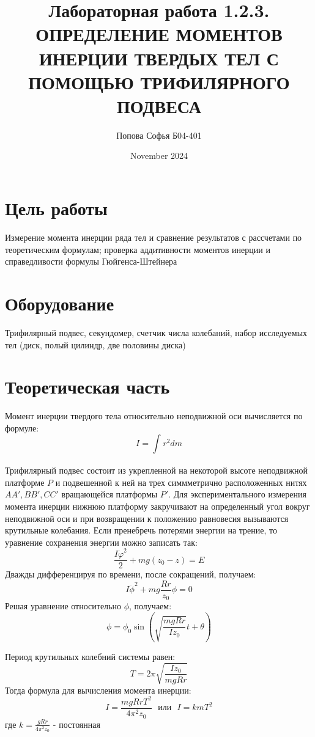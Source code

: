 \documentclass{article}
\title{\textbf{Лабораторная работа 1.2.3.} \linebreak
ОПРЕДЕЛЕНИЕ МОМЕНТОВ ИНЕРЦИИ ТВЕРДЫХ ТЕЛ С ПОМОЩЬЮ ТРИФИЛЯРНОГО ПОДВЕСА}
\author{Попова Софья Б04-401}
\date{November 2024}
\begin{document}
\maketitle

\section*{Цель работы}
Измерение момента инерции ряда тел и сравнение результатов с рассчетами по теоретическим формулам; проверка аддитивности моментов инерции и справедливости формулы Гюйгенса-Штейнера

\section*{Оборудование}
Трифилярный подвес, секундомер, счетчик числа колебаний, набор исследуемых тел (диск, полый цилиндр, две половины диска) 

\section*{Теоретическая часть}
Момент инерции твердого тела относительно неподвижной оси вычисляется по формуле: 
\begin{equation}
    I=\int_{}^{}r^2dm
\end{equation}

\noindent
Трифилярный подвес состоит из укрепленной на некоторой высоте неподвижной платформе $P$ и подвешенной к ней на трех симмметрично расположенных нитях $AA', BB', CC'$ вращающейся платформы $P'$. Для экспериментального измерения момента инерции нижнюю платформу закручивают на определенный угол вокруг неподвижной оси и при возвращении к положению равновесия вызываются крутильные колебания. Если пренебречь потерями энергии на трение, то уравнение сохранения энергии можно записать так: 
\begin{equation}
    \frac{I\dot{\varphi}^2}{2} + mg(z_0 - z) = E
\end{equation}
Дважды дифференцируя по времени, после сокращений, получаем:	
\begin{equation}
	I\ddot{\phi}^2 + mg\frac{Rr}{z_{0}}\phi = 0 
\end{equation}
Решая уравнение относительно $\phi$, получаем:
\begin{equation}
	\phi = \phi_{0}\sin\left(\sqrt{\frac{mgRr}{Iz_{0}}}t + \theta\right)
\end{equation}

\noindent
Период крутильных колебний системы равен:
\begin{equation}
    T = 2\pi \sqrt{\frac{Iz_0}{mgRr}}
\end{equation}
Тогда формула для вычисления момента инерции:
\begin{equation}
    I = \frac{mgRrT^2}{4\pi^2z_0}  \ \ \ \text{или}  \ \ \ I=kmT^2
\end{equation}
где $k = \frac{gRr}{4\pi^2z_0}$ - постоянная
\end{document}
